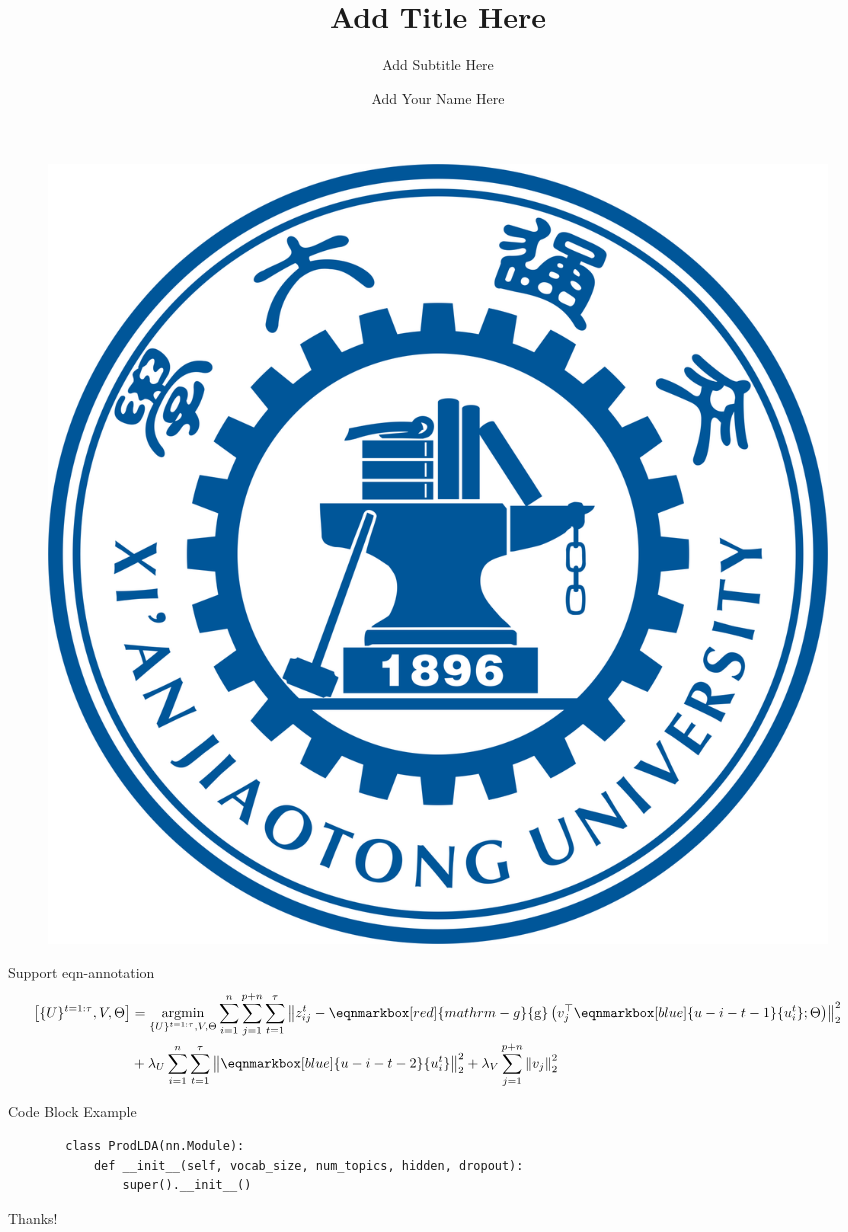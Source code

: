 \documentclass{beamer}
\author{Add Your Name Here}
\title{Add Title Here}
\subtitle{Add Subtitle Here}
\institute{Add Institute Here}
\date{\zhtoday}
\begin{document}
\begin{frame}
    \titlepage
    \begin{figure}[htpb]
        \begin{center}
            \includegraphics[width=0.2\linewidth]{pic/XJUT_Logo.png}
        \end{center}
    \end{figure}
\end{frame}

\begin{frame}
    \tableofcontents[sectionstyle=show,subsectionstyle=show/shaded/hide,subsubsectionstyle=show/shaded/hide]
\end{frame}

\begin{frame}{Support eqn-annotation}
    \begin{align*}
		\begin{aligned}
			{\left[\{U\}^{t=1: \tau}, V, \Theta\right] } & =\underset{\{U\}^{t=1: \tau}, V, \Theta}{\operatorname{argmin}} \sum_{i=1}^n \sum_{j=1}^{p+n} \sum_{t=1}^\tau\left\|z_{i j}^t-\eqnmarkbox[red]{mathrm-g}{\mathrm{g}}\left(v_j^{\top} \eqnmarkbox[blue]{u-i-t-1}{u_i^t} ; \Theta\right)\right\|_2^2 \\
			& +\lambda_U \sum_{i=1}^n \sum_{t=1}^\tau\left\|\eqnmarkbox[blue]{u-i-t-2}{u_i^t}\right\|_2^2+\lambda_V \sum_{j=1}^{p+n}\left\|v_j\right\|_2^2
		\end{aligned}
	\end{align*}
\end{frame}

\begin{frame}[fragile]{Code Block Example}
    \begin{verbatim}
        class ProdLDA(nn.Module):
            def __init__(self, vocab_size, num_topics, hidden, dropout):
                super().__init__()
    \end{verbatim}
\end{frame}

\begin{frame}
    \begin{center}
        {\Huge\calligra Thanks!}
    \end{center}
\end{frame}

%     
%     
\end{document}
